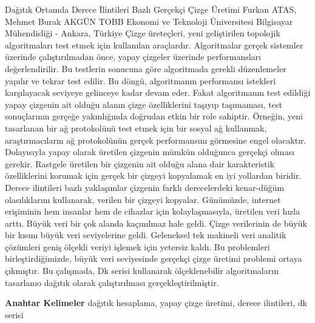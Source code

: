 
    \begin{abstract_online}{Dağıtık Ortamda Derece İlintileri Bazlı Gerçekçi Çizge Üretimi}{%
        Furkan ATAS, Mehmet Burak AKGÜN}{%
        }{%
        TOBB Ekonomi ve Teknoloji Üniversitesi Bilgisayar Mühendisliği - Ankara, Türkiye}
    Çizge üreteçleri, yeni geliştirilen topolojik algoritmaları test etmek için kullanılan araçlardır. Algoritmalar gerçek sistemler üzerinde çalıştırılmadan önce, yapay çizgeler üzerinde performansları değerlendirilir. Bu testlerin sonucuna göre algoritmada gerekli düzenlemeler yapılır ve tekrar test edilir. Bu döngü, algoritmanın performansı istekleri karşılayacak seviyeye gelinceye kadar devam eder. Fakat algoritmanın test edildiği yapay çizgenin ait olduğu alanın çizge özelliklerini taşıyıp taşımaması, test sonuçlarının gerçeğe yakınlığında doğrudan etkin bir role sahiptir. Örneğin, yeni tasarlanan bir ağ protokolünü test etmek için bir sosyal ağ kullanmak, araştırmacıların ağ protokolünün gerçek performansını görmesine engel olacaktır. Dolayısıyla yapay olarak üretilen çizgenin mümkün olduğunca gerçekçi olması gerekir. Rastgele üretilen bir çizgenin ait olduğu alana dair karakteristik özelliklerini korumak için gerçek bir çizgeyi kopyalamak en iyi yollardan biridir. Derece ilintileri bazlı yaklaşımlar çizgenin farklı derecelerdeki kenar-düğüm olasılıklarını kullanarak, verilen bir çizgeyi kopyalar. Günümüzde, internet erişiminin hem insanlar hem de cihazlar için kolaylaşmasıyla, üretilen veri hızla arttı. Büyük veri bir çok alanda kaçınılmaz hale geldi. Çizge verilerinin de büyük bir kısmı büyük veri seviyelerine geldi. Geleneksel tek makineli veri analitik çözümleri geniş ölçekli veriyi işlemek için yetersiz kaldı. Bu problemleri birleştirdiğimizde, büyük veri seviyesinde gerçekçi çizge üretimi problemi ortaya çıkmıştır. Bu çalışmada, Dk serisi kullanarak ölçeklenebilir algoritmaların tasarlanıo dağıtık olarak çalıştırılması gerçekleştirilmiştir. 
    
            \textbf{Anahtar Kelimeler} \newline{}dağıtık hesaplama, yapay çizge üretimi, derece ilintileri, dk serisi
    \end{abstract_online}
    